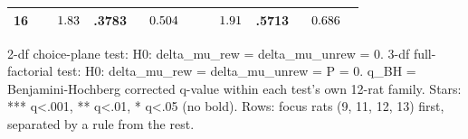 \begin{table}[htbp]
\begin{tabular}{lcccccc}
16 & $\hphantom{-}\hphantom{0}1.83$ & .3783 & $\hphantom{-}0.504^{\hphantom{**}}$ & $\hphantom{-}\hphantom{0}1.91$ & .5713 & $\hphantom{-}0.686^{\hphantom{**}}$ \\
\bottomrule
\end{tabular}
\vspace{4pt}
\par\noindent
\begin{minipage}{\linewidth}\small 2-df choice-plane test: H0: delta\_mu\_rew = delta\_mu\_unrew = 0. 3-df full-factorial test: H0: delta\_mu\_rew = delta\_mu\_unrew = P = 0. q\_BH = Benjamini-Hochberg corrected q-value within each test's own 12-rat family. Stars: *** q<.001, ** q<.01, * q<.05 (no bold). Rows: focus rats (9, 11, 12, 13) first, separated by a rule from the rest.\end{minipage}
\end{table}